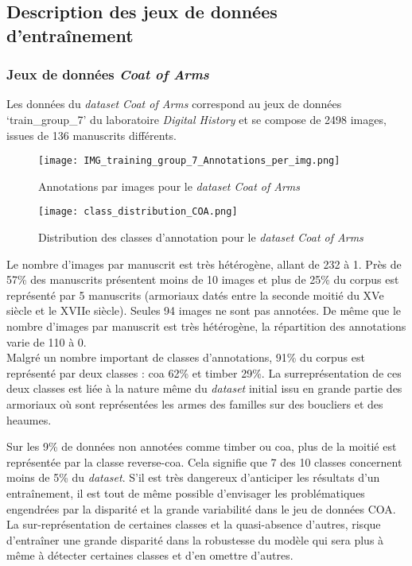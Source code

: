 \documentclass[12pt,twoside]{book}
\begin{document}
\subsection{Description des jeux de données d'entraînement}

\subsubsection{Jeux de données \textit{Coat of Arms}}

Les données du \textit{dataset} \textit{Coat of Arms} correspond au jeux de données ‘train\_group\_7’ du laboratoire \textit{Digital History} et se compose de 2498 images, issues de 136 manuscrits différents. 

\begin{figure}[ht]
    \centering
    \begin{minipage}[b]{0.45\textwidth}
        \centering
        \texttt{[image: IMG\_training\_group\_7\_Annotations\_per\_img.png]}
        \caption{Annotations par images pour le \textit{dataset Coat of Arms}}
    \end{minipage}
    \hfill
    \begin{minipage}[b]{0.45\textwidth}
        \centering
        \texttt{[image: class\_distribution\_COA.png]}
        \caption{Distribution des classes d'annotation pour le \textit{dataset Coat of Arms}}
    \end{minipage}
\end{figure}

Le nombre d’images par manuscrit est très hétérogène, allant de 232 à 1. Près de 57\% des manuscrits présentent moins de 10 images et plus de 25\% du corpus est représenté par 5 manuscrits (armoriaux datés entre la seconde moitié du XVe siècle et le XVIIe siècle). Seules 94 images ne sont pas annotées. De même que le nombre d’images par manuscrit est très hétérogène, la répartition des annotations varie de 110 à 0. \\

Malgré un nombre important de classes d’annotations, 91\% du corpus est représenté par deux classes : coa 62\% et timber 29\%. La surreprésentation de ces deux classes est liée à la nature même du \textit{dataset} initial issu en grande partie des armoriaux où sont représentées les armes des familles sur des boucliers et des heaumes. 

Sur les 9\% de données non annotées comme timber ou coa, plus de la moitié est représentée par la classe reverse-coa. Cela signifie que 7 des 10 classes concernent moins de 5\% du \textit{dataset}. S’il est très dangereux d’anticiper les résultats d’un entraînement, il est tout de même possible d’envisager les problématiques engendrées par la disparité et la grande variabilité dans le jeu de données COA. La sur-représentation de certaines classes et la quasi-absence d’autres, risque d’entraîner une grande disparité dans la robustesse du modèle qui sera plus à même à détecter certaines classes et d’en omettre d’autres. 
\end{document}
